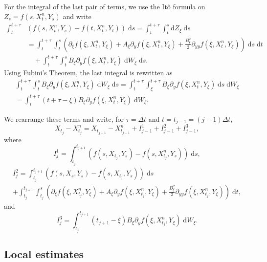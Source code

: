 \documentclass[reqno,12pt]{amsart}
\theoremstyle{plain}%
\theoremstyle{definition}
\begin{document}
For the integral of the last pair of terms, we use the It\^o formula on $Z_s = f(s, X_t^n, Y_s)$ and write
\begin{align*}
\int_t^{t + \tau} & \left(f(s, X_t^n, Y_s) - f(t, X_t^n, Y_t) \right)\;\mathrm{d}s  = \int_t^{t + \tau} \int_t^s \mathrm{d}Z_\xi \;\mathrm{d}s \\
& = \int_t^{t + \tau} \int_t^s \left(\partial_\xi f(\xi, X_t^n, Y_\xi) + A_\xi \partial_y f(\xi, X_t^n, Y_\xi)  + \frac{B_\xi^2}{2}\partial_{yy}f(\xi, X_t^n, Y_\xi) \right) \;\mathrm{d}s\;\mathrm{d}t \\ 
& \quad + \int_t^{t + \tau} \int_t^s B_\xi \partial_y f(\xi, X_t^n, Y_\xi)\;\mathrm{d}W_\xi\;\mathrm{d}s.
\end{align*}
Using Fubini's Theorem, the last integral is rewritten as
\begin{multline}
\label{fubini}
\int_t^{t + \tau} \int_t^s B_\xi \partial_y f(\xi, X_t^n, Y_\xi)\;\mathrm{d}W_\xi\;\mathrm{d}s 
  = \int_t^{t + \tau} \int_\xi^{t + \tau} B_\xi \partial_y f(\xi, X_t^n, Y_\xi) \;\mathrm{d}s \;\mathrm{d}W_\xi \\
  = \int_t^{t+\tau} (t + \tau - \xi) B_\xi \partial_y f(\xi, X_t^n, Y_\xi) \;\mathrm{d}W_\xi.
\end{multline}

We rearrange these terms and write, for $\tau = \Delta t$ and $t = t_{j-1} = (j-1)\Delta t$,
\begin{equation}
\label{stepexpression}
X_{t_j} - X_{t_j}^n  = X_{t_{j-1}} - X_{t_{j-1}}^n  + I_{j-1}^{1} + I_{j-1}^{2} + I_{j-1}^{3},
\end{equation}
where
$$
I_j^{1} = \int_{t_j}^{t_{j+1}} \left( f(s, X_{t_j}, Y_s) - f(s, X_{t_j}^n, Y_s) \right)\;\mathrm{d}s,
$$
\begin{multline*}
  I_j^2 =  \int_{t_j}^{t_{j+1}}  \left( f(s, X_s, Y_s) - f(s, X_{t_j}, Y_s) \right)\;\mathrm{d}s \\ 
 +  \int_{t_j}^{t_{j+1}} \int_{t_j}^s \left(\partial_\xi f(\xi, X_{t_j}^n, Y_\xi) + A_\xi \partial_y f(\xi, X_{t_j}^n, Y_\xi)  + \frac{B_\xi^2}{2}\partial_{yy}f(\xi, X_{t_j}^n, Y_\xi) \right) \;\mathrm{d}t,
\end{multline*}
and
$$
I_j^3 = \int_{t_j}^{t_{j+1}}  (t_{j+1} - \xi) B_\xi \partial_y f(\xi, X_{t_j}^n, Y_\xi) \;\mathrm{d}W_\xi.
$$

\subsection{Local estimates}
\end{document}
